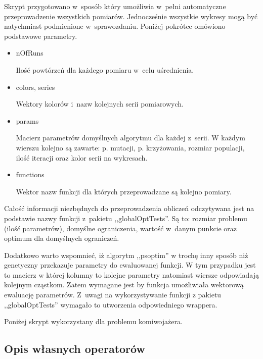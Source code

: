 \documentclass[11pt, a4paper]{article}
\newcommand{\fbi}{\leavevmode{\parindent=1em\indent}}
\begin{document}
\fbi
Skrypt przygotowano w~sposób który umożliwia w~pełni automatyczne przeprowadzenie wszystkich pomiarów. Jednocześnie wszystkie wykresy mogą być natychmiast podmienione w~sprawozdaniu. Poniżej pokrótce omówiono podstawowe parametry.


\begin{itemize}
	\item nOfRuns
	
	Ilość powtórzeń dla każdego pomiaru w~celu uśrednienia.
	
	\item colors, series
	
	Wektory kolorów i~nazw kolejnych serii pomiarowych. 
	
	\item params
	
	Macierz parametrów domyślnych algorytmu dla każdej z~serii. W każdym wierszu kolejno są zawarte: p. mutacji, p. krzyżowania, rozmiar populacji, ilość iteracji oraz kolor serii na wykresach.
	
	\item functions
	
	Wektor nazw funkcji dla których przeprowadzane są kolejno pomiary.
	
\end{itemize}

Całość informacji niezbędnych do przeprowadzenia obliczeń odczytywana jest na podstawie nazwy funkcji z~pakietu ,,globalOptTests''. Są to: rozmiar problemu (ilość parametrów), domyślne ograniczenia, wartość w~danym punkcie oraz optimum dla domyślnych ograniczeń.

\fbi
Dodatkowo warto wspomnieć, iż algorytm ,,psoptim'' w trochę inny sposób niż genetyczny przekazuje parametry do ewaluowanej funkcji. W tym przypadku jest to macierz w której kolumny to kolejne parametry natomiast wiersze odpowiadają kolejnym cząstkom. Zatem wymagane jest by funkcja umożliwiała wektorową ewaluację parametrów. Z~uwagi na wykorzystywanie funkcji z pakietu ,,globalOptTests'' wymagało to utworzenia odpowiedniego wrappera.


\fbi
Poniżej skrypt wykorzystany dla problemu komiwojażera.




\subsection{Opis własnych operatorów}
\end{document}

